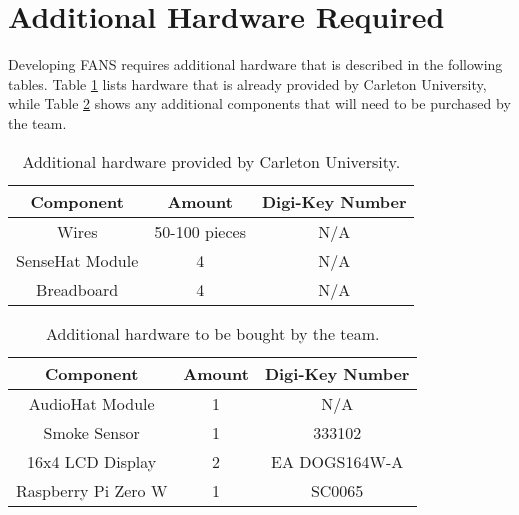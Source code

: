 \section{Additional Hardware Required}

Developing FANS requires additional hardware that is described in the following tables. Table \ref{t:cu-hw} lists
hardware that is already provided by Carleton University, while Table \ref{t:extra-hw} shows any additional components
that will need to be purchased by the team.

\begin{table}[H]
    \centering
    \begin{tabular}{| c | c | c |}
        \hline
        Component       & Amount        & Digi-Key Number \\
        \hline
        Wires           & 50-100 pieces & N/A             \\
        \hline
        SenseHat Module & 4             & N/A             \\
        \hline
        Breadboard      & 4             & N/A             \\
        \hline
    \end{tabular}
    \caption{Additional hardware provided by Carleton University.}
    \label{t:cu-hw}
\end{table}

\begin{table}[H]
    \centering
    \begin{tabular}{| c | c | c |}
        \hline
        Component           & Amount & Digi-Key Number \\
        \hline
        AudioHat Module     & 1      & N/A             \\
        \hline
        Smoke Sensor        & 1      & 333102          \\
        \hline
        16x4 LCD Display    & 2      & EA DOGS164W-A   \\
        \hline
        Raspberry Pi Zero W & 1      & SC0065          \\
        \hline
    \end{tabular}
    \caption{Additional hardware to be bought by the team.}
    \label{t:extra-hw}
\end{table}
